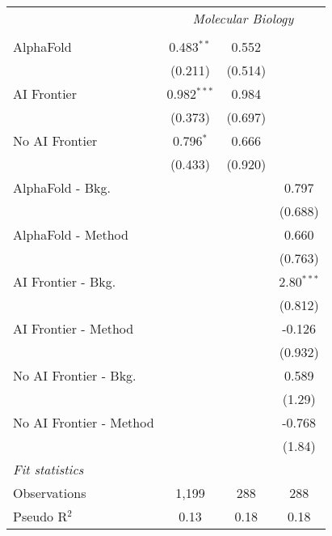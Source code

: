 \begin{tabular}{lccc}
 & \multicolumn{3}{c}{\textit{Molecular Biology}} \\ \\
   AlphaFold               & 0.483$^{**}$  & 0.552   &   \\   
                           & (0.211)       & (0.514) &   \\   
   AI Frontier             & 0.982$^{***}$ & 0.984   &   \\   
                           & (0.373)       & (0.697) &   \\   
   No AI Frontier          & 0.796$^{*}$   & 0.666   &   \\   
                           & (0.433)       & (0.920) &   \\   
   AlphaFold - Bkg.        &               &         & 0.797\\   
                           &               &         & (0.688)\\   
   AlphaFold - Method      &               &         & 0.660\\   
                           &               &         & (0.763)\\   
   AI Frontier - Bkg.      &               &         & 2.80$^{***}$\\   
                           &               &         & (0.812)\\   
   AI Frontier - Method    &               &         & -0.126\\   
                           &               &         & (0.932)\\   
   No AI Frontier - Bkg.   &               &         & 0.589\\   
                           &               &         & (1.29)\\   
   No AI Frontier - Method &               &         & -0.768\\   
                           &               &         & (1.84)\\   
   \midrule
   \emph{Fit statistics}\\
   Observations            & 1,199         & 288     & 288\\  
   Pseudo R$^2$            & 0.13          & 0.18    & 0.18\\  
   

\end{tabular}
